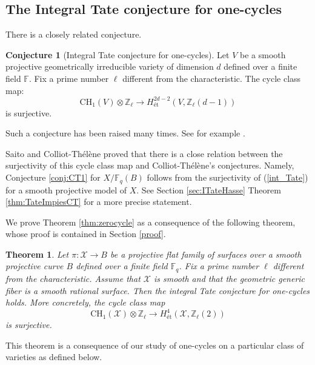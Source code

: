 \documentclass{amsart}
\newtheorem{thm}[theorem]{Theorem}
\theoremstyle{definition}
\newtheorem{conj}[theorem]{Conjecture}
\theoremstyle{remark}
\newcommand{\mbb}{\mathbb}
\newcommand{\FF}{\mbb{F}}
\newcommand{\ZZ}{\mbb{Z}}
\newcommand{\mc}{\mathcal}
\newcommand{\mcX}{\mc{X}}
\newcommand{\et}{\text{\'et}}
\begin{document}
\subsection{The Integral Tate conjecture for one-cycles}

There is a closely related conjecture.

\begin{conj}[Integral Tate conjecture for one-cycles]
    Let $V$ be a smooth projective geometrically irreducible variety of dimension $d$ defined over a finite field $\FF$. Fix a prime number $\ell$ different from the characteristic. The cycle class map:
\begin{equation}\label{int_Tate}
\text{CH}_1(V) \otimes \ZZ_\ell \to H^{2d-2}_\et(V, \ZZ_\ell(d-1))
\end{equation}
is surjective.
\end{conj}

Such a conjecture has been raised many times. See for example \cite{CTSzamuelyIntegralTate,CTKahnCycleCodim2, CT_Scavia_ITC}.


Saito \cite{SaitoMotivicCoh_ArithmeticScheme} and Colliot-Th\'el\`ene \cite{CTLocalGlobalChow} proved that there is a close relation between the surjectivity of this cycle class map  and Colliot-Th\'el\`ene's conjectures. Namely, Conjecture \ref{conj:CT1} for $X/\FF_q(B)$ follows from the surjectivity of (\ref{int_Tate}) for a smooth projective model of $X$. See Section \ref{sec:ITateHasse} Theorem \ref{thm:TateImpiesCT} for a more precise statement.



We prove Theorem \ref{thm:zerocycle} as a consequence of the following theorem, whose proof is contained in Section \ref{proof}.
\begin{thm}\label{thm:integralTateSurface}
Let $\pi: \mcX \to B$ be a projective flat family of surfaces over a smooth projective curve $B$ defined over a finite field $\FF_q$. Fix a prime number $\ell$ different from the characteristic. Assume that $\mcX$ is smooth and that the geometric generic fiber is a smooth rational surface. Then the integral Tate conjecture for one-cycles holds. More concretely, the cycle class map
 \[
\text{CH}_1(\mcX)\otimes \ZZ_\ell \to H^{4}_\text{\'et}(\mcX, \ZZ_\ell(2))
\] 
 is surjective.
\end{thm}


This theorem is a consequence of our study of one-cycles on a particular class of varieties as defined below.
\end{document}
